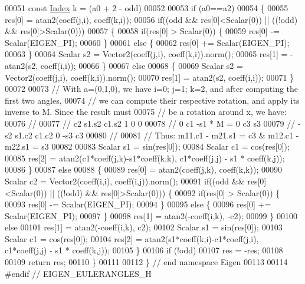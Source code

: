 \begin{DoxyCode}
00051   const \hyperlink{namespace_eigen_a62e77e0933482dafde8fe197d9a2cfde}{Index} k = (a0 + 2 - odd)%
00052   
00053   if (a0==a2)
00054   \{
00055     res[0] = atan2(coeff(j,i), coeff(k,i));
00056     \textcolor{keywordflow}{if}((odd && res[0]<Scalar(0)) || ((!odd) && res[0]>Scalar(0)))
00057     \{
00058       \textcolor{keywordflow}{if}(res[0] > Scalar(0)) \{
00059         res[0] -= Scalar(EIGEN\_PI);
00060       \}
00061       \textcolor{keywordflow}{else} \{
00062         res[0] += Scalar(EIGEN\_PI);
00063       \}
00064       Scalar s2 = Vector2(coeff(j,i), coeff(k,i)).norm();
00065       res[1] = -atan2(s2, coeff(i,i));
00066     \}
00067     \textcolor{keywordflow}{else}
00068     \{
00069       Scalar s2 = Vector2(coeff(j,i), coeff(k,i)).norm();
00070       res[1] = atan2(s2, coeff(i,i));
00071     \}
00072     
00073     \textcolor{comment}{// With a=(0,1,0), we have i=0; j=1; k=2, and after computing the first two angles,}
00074     \textcolor{comment}{// we can compute their respective rotation, and apply its inverse to M. Since the result must}
00075     \textcolor{comment}{// be a rotation around x, we have:}
00076     \textcolor{comment}{//}
00077     \textcolor{comment}{//  c2  s1.s2 c1.s2                   1  0   0 }
00078     \textcolor{comment}{//  0   c1    -s1       *    M    =   0  c3  s3}
00079     \textcolor{comment}{//  -s2 s1.c2 c1.c2                   0 -s3  c3}
00080     \textcolor{comment}{//}
00081     \textcolor{comment}{//  Thus:  m11.c1 - m21.s1 = c3  &   m12.c1 - m22.s1 = s3}
00082     
00083     Scalar s1 = sin(res[0]);
00084     Scalar c1 = cos(res[0]);
00085     res[2] = atan2(c1*coeff(j,k)-s1*coeff(k,k), c1*coeff(j,j) - s1 * coeff(k,j));
00086   \} 
00087   \textcolor{keywordflow}{else}
00088   \{
00089     res[0] = atan2(coeff(j,k), coeff(k,k));
00090     Scalar c2 = Vector2(coeff(i,i), coeff(i,j)).norm();
00091     \textcolor{keywordflow}{if}((odd && res[0]<Scalar(0)) || ((!odd) && res[0]>Scalar(0))) \{
00092       \textcolor{keywordflow}{if}(res[0] > Scalar(0)) \{
00093         res[0] -= Scalar(EIGEN\_PI);
00094       \}
00095       \textcolor{keywordflow}{else} \{
00096         res[0] += Scalar(EIGEN\_PI);
00097       \}
00098       res[1] = atan2(-coeff(i,k), -c2);
00099     \}
00100     \textcolor{keywordflow}{else}
00101       res[1] = atan2(-coeff(i,k), c2);
00102     Scalar s1 = sin(res[0]);
00103     Scalar c1 = cos(res[0]);
00104     res[2] = atan2(s1*coeff(k,i)-c1*coeff(j,i), c1*coeff(j,j) - s1 * coeff(k,j));
00105   \}
00106   \textcolor{keywordflow}{if} (!odd)
00107     res = -res;
00108   
00109   \textcolor{keywordflow}{return} res;
00110 \}
00111 
00112 \} \textcolor{comment}{// end namespace Eigen}
00113 
00114 \textcolor{preprocessor}{#endif // EIGEN\_EULERANGLES\_H}
\end{DoxyCode}
